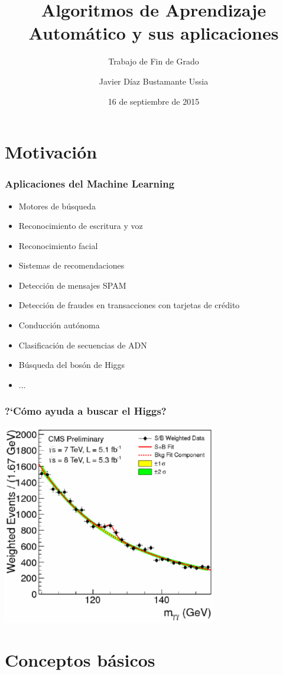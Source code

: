 \documentclass[10pt]{beamer}
\title[Aprendizaje Autom\'atico]{Algoritmos de Aprendizaje Autom\'atico y sus aplicaciones}
\subtitle{Trabajo de Fin de Grado}
\author{Javier D\'iaz Bustamante Ussia}
\institute{Universidad Complutense de Madrid}
\date[16/09/15]{16 de septiembre de 2015}
\begin{document}
\begin{frame}
	\titlepage
\end{frame}

\section{Motivaci\'on}

\begin{frame}
	\frametitle{Aplicaciones del Machine Learning}
	\begin{itemize}
		\item Motores de b\'usqueda
		\item Reconocimiento de escritura y voz
		\item Reconocimiento facial
		\item Sistemas de recomendaciones
		\item Detecci\'on de mensajes SPAM
		\item Detecci\'on de fraudes en transacciones con tarjetas de cr\'edito
		\item Conducci\'on aut\'onoma
		\item Clasificaci\'on de secuencias de ADN
		\item B\'usqueda del bos\'on de Higgs
		\item ...
	\end{itemize}
\end{frame}

\begin{frame}
	\frametitle{?`C\'omo ayuda a buscar el Higgs?}
	\centering\includegraphics[width = 0.7\textwidth]{exceso_eventos_higgs}
\end{frame}

\section{Conceptos b\'asicos}
\end{document}
